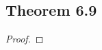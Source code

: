 \documentclass[../../main.tex]{subfiles}
\begin{document}
\subsection{Theorem 6.9}
\begin{wts}

\end{wts}
\begin{proof}

\end{proof}
\end{document}
